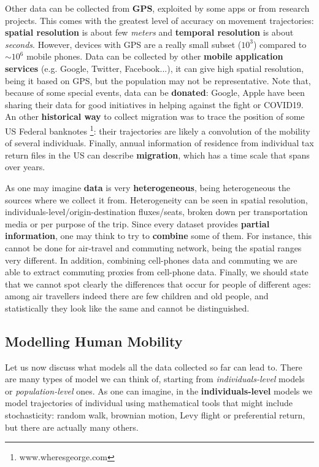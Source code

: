 \documentclass[../main/main.tex]{subfiles}
\begin{document}
Other data can be collected from \textbf{GPS}, exploited by some apps or from research projects. This comes with the greatest level of accuracy on movement trajectories: \textbf{spatial resolution} is about few \textit{meters} and \textbf{temporal resolution} is about \textit{seconds}. However, devices with GPS are a really small subset ($10^3$) compared to $\sim 10^6$ mobile phones. Data can be collected by other \textbf{mobile application services} (e.g. Google, Twitter, Facebook...), it can give high spatial resolution, being it based on GPS, but the population may not be representative. Note that, because of some special events, data can be \textbf{donated}: Google, Apple have been sharing their data for good initiatives in helping against the fight or COVID19. An other \textbf{historical way} to collect migration was to trace the position of some US Federal banknotes \footnote{www.wheresgeorge.com}: their trajectories are likely a convolution of the mobility of several individuals. Finally, annual information of residence from individual tax return files in the US can describe \textbf{migration}, which has a time scale that spans over years.

As one may imagine \textbf{data} is very \textbf{heterogeneous}, being heterogeneous the sources where we collect it from. Heterogeneity can be seen in spatial resolution, individuals-level/origin-destination fluxes/seats, broken down per transportation media or per purpose of the trip. Since every dataset provides \textbf{partial information}, one may think to try to \textbf{combine} some of them. For instance, this cannot be done for air-travel and commuting network, being the spatial ranges very different. In addition, combining cell-phones data and commuting we are able to extract commuting proxies from cell-phone data. Finally, we should state that we cannot spot clearly the differences that occur for people of different ages: among air travellers indeed there are few children and old people, and statistically they look like the same and cannot be distinguished.



\subsection{Modelling Human Mobility}

Let us now discuss what models all the data collected so far can lead to. There are many types of model we can think of, starting from \textit{individuals-level} models or \textit{population-level} ones. As one can imagine, in the \textbf{individuals-level} models we model trajectories of individual using mathematical tools that might include stochasticity: random walk, brownian motion, Levy flight or preferential return, but there are actually many others.
\end{document}
